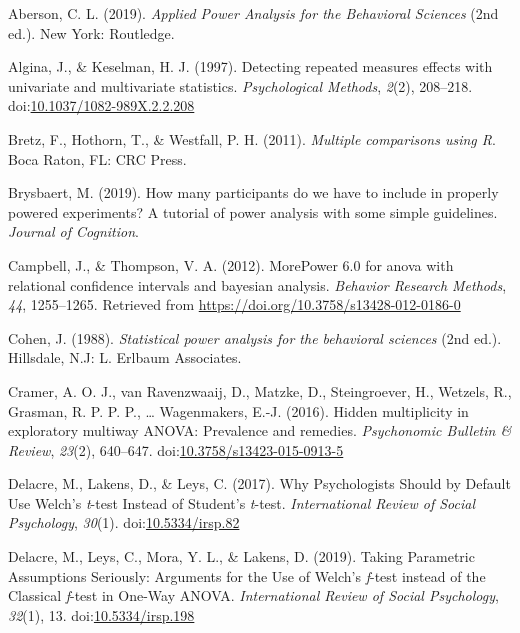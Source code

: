 \documentclass[
  ,jou,floatsintext]{apa6}
\begin{document}
\setlength{\parindent}{-0.5in}
\setlength{\leftskip}{0.5in}

\hypertarget{refs}{}
\leavevmode\hypertarget{ref-aberson_applied_2019}{}%
Aberson, C. L. (2019). \emph{Applied Power Analysis for the Behavioral Sciences} (2nd ed.). New York: Routledge.

\leavevmode\hypertarget{ref-algina_detecting_1997}{}%
Algina, J., \& Keselman, H. J. (1997). Detecting repeated measures effects with univariate and multivariate statistics. \emph{Psychological Methods}, \emph{2}(2), 208--218. doi:\href{https://doi.org/10.1037/1082-989X.2.2.208}{10.1037/1082-989X.2.2.208}

\leavevmode\hypertarget{ref-bretz_multiple_2011}{}%
Bretz, F., Hothorn, T., \& Westfall, P. H. (2011). \emph{Multiple comparisons using R}. Boca Raton, FL: CRC Press.

\leavevmode\hypertarget{ref-brysbaert_how_2019}{}%
Brysbaert, M. (2019). How many participants do we have to include in properly powered experiments? A tutorial of power analysis with some simple guidelines. \emph{Journal of Cognition}.

\leavevmode\hypertarget{ref-Campbell2012MorePower6F}{}%
Campbell, J., \& Thompson, V. A. (2012). MorePower 6.0 for anova with relational confidence intervals and bayesian analysis. \emph{Behavior Research Methods}, \emph{44}, 1255--1265. Retrieved from \url{https://doi.org/10.3758/s13428-012-0186-0}

\leavevmode\hypertarget{ref-cohen_statistical_1988}{}%
Cohen, J. (1988). \emph{Statistical power analysis for the behavioral sciences} (2nd ed.). Hillsdale, N.J: L. Erlbaum Associates.

\leavevmode\hypertarget{ref-cramer_hidden_2016}{}%
Cramer, A. O. J., van Ravenzwaaij, D., Matzke, D., Steingroever, H., Wetzels, R., Grasman, R. P. P. P., \ldots{} Wagenmakers, E.-J. (2016). Hidden multiplicity in exploratory multiway ANOVA: Prevalence and remedies. \emph{Psychonomic Bulletin \& Review}, \emph{23}(2), 640--647. doi:\href{https://doi.org/10.3758/s13423-015-0913-5}{10.3758/s13423-015-0913-5}

\leavevmode\hypertarget{ref-delacre_why_2017}{}%
Delacre, M., Lakens, D., \& Leys, C. (2017). Why Psychologists Should by Default Use Welch's \emph{t}-test Instead of Student's \emph{t}-test. \emph{International Review of Social Psychology}, \emph{30}(1). doi:\href{https://doi.org/10.5334/irsp.82}{10.5334/irsp.82}

\leavevmode\hypertarget{ref-delacre_taking_2019}{}%
Delacre, M., Leys, C., Mora, Y. L., \& Lakens, D. (2019). Taking Parametric Assumptions Seriously: Arguments for the Use of Welch's \emph{f}-test instead of the Classical \emph{f}-test in One-Way ANOVA. \emph{International Review of Social Psychology}, \emph{32}(1), 13. doi:\href{https://doi.org/10.5334/irsp.198}{10.5334/irsp.198}
\end{document}
